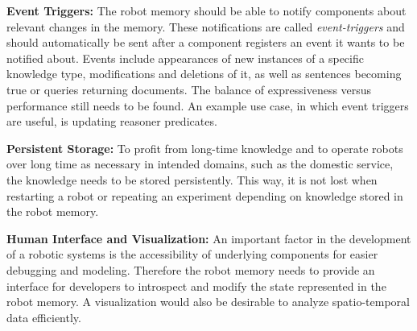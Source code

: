 \smallskip
\textbf{Event Triggers:} The robot memory should be able to notify
components about relevant changes in the memory.  These notifications
are called \emph{event-triggers} and should automatically be sent
after a component registers an event it wants to be notified
about. Events include appearances of new instances of a specific
knowledge type, modifications and deletions of it, as well as
sentences becoming true or queries returning documents. The balance of
expressiveness versus performance still needs to be found. An example
use case, in which event triggers are useful, is updating reasoner
predicates.


\smallskip
\textbf{Persistent Storage:} To profit from long-time knowledge and to
operate robots over long time as necessary in intended domains,
such as the domestic service, the knowledge needs to be stored
persistently. This way, it is not lost when restarting a robot or
repeating an experiment depending on knowledge stored in the robot
memory.

\smallskip
\textbf{Human Interface and Visualization:} An important factor in the
development of a robotic systems is the accessibility of underlying
components for easier debugging and modeling. Therefore the robot
memory needs to provide an interface for developers to introspect and
modify the state represented in the robot memory. A visualization
would also be desirable to analyze spatio-temporal data efficiently.

